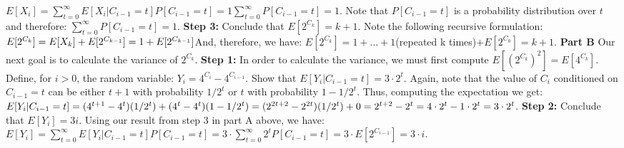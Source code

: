 \documentclass[12pt]{article}
\begin{document}
$E[X_i] = \sum\limits_{t=0}^{\infty} E[X_i | C_{i-1} = t] P[C_{i-1} = t] = 1 \sum\limits_{t=0}^{\infty} P[C_{i-1} = t] = 1$.
\newline
Note that $P[C_{i-1} = t]$ is a probability distribution over $t$ and therefore: $\sum\limits_{t=0}^{\infty} P[C_{i-1} = t] = 1$.
\newline
\newline
\textbf{Step 3: } Conclude that $E[2^{C_k}] = k+1$.
\newline
\newline
Note the following recursive formulation:
\newline
$E[2^{C_k}] = E[X_k] + E[2^{C_{k-1}}] = 1 + E[2^{C_{k-1}}] 
\newline
$And, therefore, we have:
\newline$
E[2^{C_k}] = 1 + ... + 1 $(repeated k times)$ + E[2^{C_0}] = k+1$.
\newline
\newline
\textbf{Part B} Our next goal is to calculate the variance of $2^{C_k}$.
\newline
\newline
\textbf{Step 1: } In order to calculate the variance, we must first compute $E[(2^{C_k})^2] = E[4^{C_k}]$. Define, for $i > 0$,
the random variable: $Y_i = 4^{C_i} - 4^{C_{i-1}}$. Show that $E[Y_i | C_{i-1} = t] = 3\cdot 2^t$.
\newline
\newline
Again, note that the value of $C_i$ conditioned on $C_{i-1} = t$ can be either $t+1$ with probability $1/2^t$ or $t$ with
probability $1 - 1/2^t$. Thus, computing the expectation we get:
\newline
\newline
$E[Y_i | C_{i-1} = t] = (4^{t+1} - 4^t)(1/2^t) + (4^t - 4^t)(1 - 1/2^t) = (2^{2t + 2} - 2^{2t})(1/2^t) + 0
\newline = 2^{t+2} - 2^t = 4\cdot 2^t - 1 \cdot 2^t = 3 \cdot 2^t$.
\newline
\newline
\textbf{Step 2: } Conclude that $E[Y_i] = 3 i$.
\newline
\newline
Using our result from step 3 in part A above, we have:
\newline
$E[Y_i] = \sum\limits_{t = 0}^{\infty} E[Y_i | C_{i-1} = t] P[C_{i-1} = t] = 3 \cdot \sum\limits_{t = 0}^{\infty} 2^t P[C_{i-1} = t] = 3 \cdot E[2^{C_{i-1}}] = 3 \cdot i$.
\newline
\newline
\end{document}
